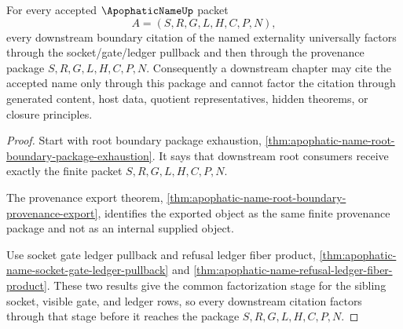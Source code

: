 \begin{theorem}
\label{thm:apophatic-name-boundary-citation-universal-factorization}
For every accepted $\ApophaticNameUp$ packet
$$
A=(S,R,G,L,H,C,P,N),
$$
every downstream boundary citation of the named externality universally factors through the socket/gate/ledger pullback and then through the provenance package $S,R,G,L,H,C,P,N$. Consequently a downstream chapter may cite the accepted name only through this package and cannot factor the citation through generated content, host data, quotient representatives, hidden theorems, or closure principles.
\end{theorem}
\begin{proof}
Start with root boundary package exhaustion, \autoref{thm:apophatic-name-root-boundary-package-exhaustion}. It says that downstream root consumers receive exactly the finite packet $S,R,G,L,H,C,P,N$.

The provenance export theorem, \autoref{thm:apophatic-name-root-boundary-provenance-export}, identifies the exported object as the same finite provenance package and not as an internal supplied object.

Use socket gate ledger pullback and refusal ledger fiber product, \autoref{thm:apophatic-name-socket-gate-ledger-pullback} and \autoref{thm:apophatic-name-refusal-ledger-fiber-product}. These two results give the common factorization stage for the sibling socket, visible gate, and ledger rows, so every downstream citation factors through that stage before it reaches the package $S,R,G,L,H,C,P,N$.
\end{proof}
